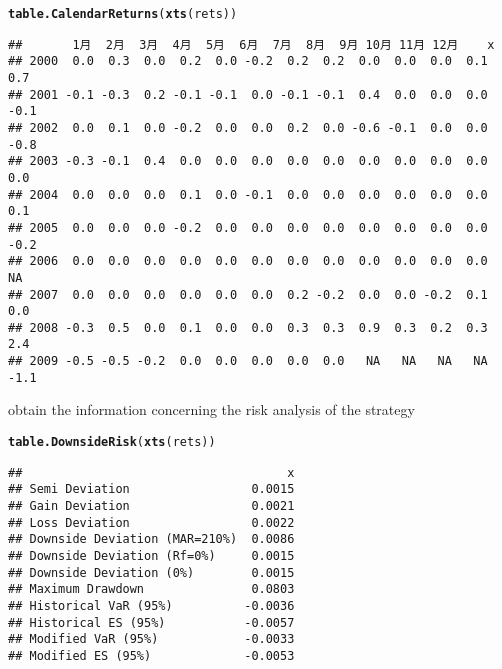 \documentclass{article}\usepackage[]{graphicx}\usepackage[]{color}
\makeatletter
\newcommand{\hlstd}[1]{\textcolor[rgb]{0.345,0.345,0.345}{#1}}%
\newcommand{\hlkwd}[1]{\textcolor[rgb]{0.737,0.353,0.396}{\textbf{#1}}}%
\newenvironment{kframe}{%
 \def\at@end@of@kframe{}%
 \ifinner\ifhmode%
  \def\at@end@of@kframe{\end{minipage}}%
  \begin{minipage}{\columnwidth}%
 \fi\fi%
 \def\FrameCommand##1{\hskip\@totalleftmargin \hskip-\fboxsep
 \colorbox{shadecolor}{##1}\hskip-\fboxsep
     \hskip-\linewidth \hskip-\@totalleftmargin \hskip\columnwidth}%
 \MakeFramed {\advance\hsize-\width
   \@totalleftmargin\z@ \linewidth\hsize
   \@setminipage}}%
 {\par\unskip\endMakeFramed%
 \at@end@of@kframe}
\newenvironment{knitrout}{}{} %
\makeatother
\begin{document}
\begin{knitrout}
\color{fgcolor}\begin{kframe}
\begin{alltt}
\hlkwd{table.CalendarReturns}\hlstd{(}\hlkwd{xts}\hlstd{(rets))}
\end{alltt}
\begin{verbatim}
##       1月  2月  3月  4月  5月  6月  7月  8月  9月 10月 11月 12月    x
## 2000  0.0  0.3  0.0  0.2  0.0 -0.2  0.2  0.2  0.0  0.0  0.0  0.1  0.7
## 2001 -0.1 -0.3  0.2 -0.1 -0.1  0.0 -0.1 -0.1  0.4  0.0  0.0  0.0 -0.1
## 2002  0.0  0.1  0.0 -0.2  0.0  0.0  0.2  0.0 -0.6 -0.1  0.0  0.0 -0.8
## 2003 -0.3 -0.1  0.4  0.0  0.0  0.0  0.0  0.0  0.0  0.0  0.0  0.0  0.0
## 2004  0.0  0.0  0.0  0.1  0.0 -0.1  0.0  0.0  0.0  0.0  0.0  0.0  0.1
## 2005  0.0  0.0  0.0 -0.2  0.0  0.0  0.0  0.0  0.0  0.0  0.0  0.0 -0.2
## 2006  0.0  0.0  0.0  0.0  0.0  0.0  0.0  0.0  0.0  0.0  0.0  0.0   NA
## 2007  0.0  0.0  0.0  0.0  0.0  0.0  0.2 -0.2  0.0  0.0 -0.2  0.1  0.0
## 2008 -0.3  0.5  0.0  0.1  0.0  0.0  0.3  0.3  0.9  0.3  0.2  0.3  2.4
## 2009 -0.5 -0.5 -0.2  0.0  0.0  0.0  0.0  0.0   NA   NA   NA   NA -1.1
\end{verbatim}
\end{kframe}
\end{knitrout}
obtain the information concerning the risk analysis of the strategy
\begin{knitrout}
\color{fgcolor}\begin{kframe}
\begin{alltt}
\hlkwd{table.DownsideRisk}\hlstd{(}\hlkwd{xts}\hlstd{(rets))}
\end{alltt}
\begin{verbatim}
##                                     x
## Semi Deviation                 0.0015
## Gain Deviation                 0.0021
## Loss Deviation                 0.0022
## Downside Deviation (MAR=210%)  0.0086
## Downside Deviation (Rf=0%)     0.0015
## Downside Deviation (0%)        0.0015
## Maximum Drawdown               0.0803
## Historical VaR (95%)          -0.0036
## Historical ES (95%)           -0.0057
## Modified VaR (95%)            -0.0033
## Modified ES (95%)             -0.0053
\end{verbatim}
\end{kframe}
\end{knitrout}
\end{document}
